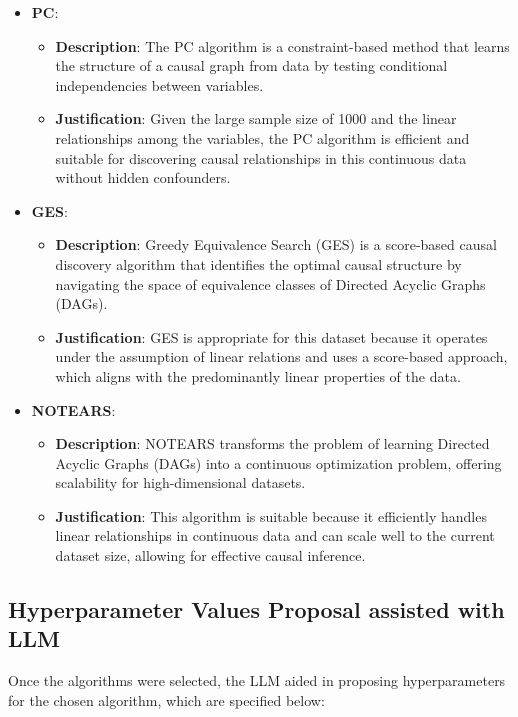 \documentclass{article}
\begin{document}
\begin{itemize}

\item \textbf{PC}:
\begin{itemize}
    \item \textbf{Description}: The PC algorithm is a constraint-based method that learns the structure of a causal graph from data by testing conditional independencies between variables.
    \item \textbf{Justification}: Given the large sample size of 1000 and the linear relationships among the variables, the PC algorithm is efficient and suitable for discovering causal relationships in this continuous data without hidden confounders.
\end{itemize}

\item \textbf{GES}:
\begin{itemize}
    \item \textbf{Description}: Greedy Equivalence Search (GES) is a score-based causal discovery algorithm that identifies the optimal causal structure by navigating the space of equivalence classes of Directed Acyclic Graphs (DAGs).
    \item \textbf{Justification}: GES is appropriate for this dataset because it operates under the assumption of linear relations and uses a score-based approach, which aligns with the predominantly linear properties of the data.
\end{itemize}

\item \textbf{NOTEARS}:
\begin{itemize}
    \item \textbf{Description}: NOTEARS transforms the problem of learning Directed Acyclic Graphs (DAGs) into a continuous optimization problem, offering scalability for high-dimensional datasets.
    \item \textbf{Justification}: This algorithm is suitable because it efficiently handles linear relationships in continuous data and can scale well to the current dataset size, allowing for effective causal inference.
\end{itemize}

\end{itemize}
                    

\subsection{Hyperparameter Values Proposal assisted with LLM}
Once the algorithms were selected, the LLM aided in proposing hyperparameters 
for the chosen algorithm, which are specified below:
        
\end{document}
